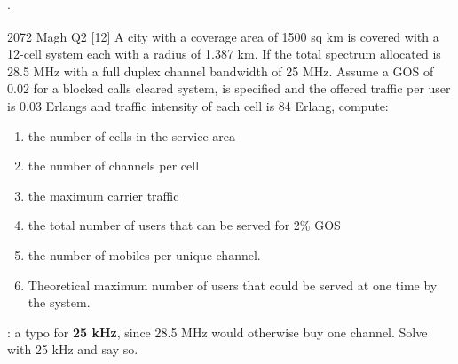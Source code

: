 \hr

{\color{sub}\footnotesize {}  \gap$\cdot$\gap {}}

\begin{asked}{2072 Magh \textperiodcentered{} Q2 \textperiodcentered{} [12]}
A city with a coverage area of 1500 sq km is covered with a 12-cell system each with a radius
of 1.387 km. If the total spectrum allocated is 28.5 MHz with a full duplex channel bandwidth
of 25 MHz. Assume a GOS of 0.02 for a blocked calls cleared system, is specified and the
offered traffic per user is 0.03 Erlangs and traffic intensity of each cell is 84 Erlang,
compute:
\begin{enumerate}[label=(\alph*), leftmargin=1.9em]
  \item the number of cells in the service area
  \item the number of channels per cell
  \item the maximum carrier traffic
  \item the total number of users that can be served for 2\% GOS
  \item the number of mobiles per unique channel.
  \item Theoretical maximum number of users that could be served at one time by the system.
\end{enumerate}
\par\vspace{1pt}
{\color{sub}: a typo for
\textbf{25 kHz}, since 28.5 MHz would otherwise buy one channel. Solve with 25 kHz and say so.}
\end{asked}

